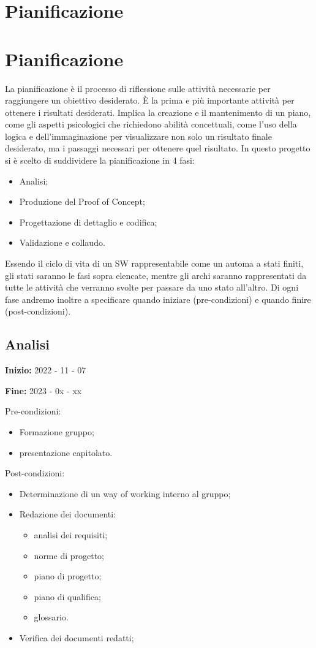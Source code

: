 \chapter{Pianificazione}
\chapter{Pianificazione}
La pianificazione è il processo di riflessione sulle attività necessarie per raggiungere un obiettivo desiderato. È la prima e più importante attività per ottenere i risultati desiderati. Implica la creazione e il mantenimento di un piano, come gli aspetti psicologici che richiedono abilità concettuali, come l'uso della logica e dell'immaginazione per visualizzare non solo un risultato finale desiderato, ma i passaggi necessari per ottenere quel risultato. In questo progetto si è scelto di suddividere la pianificazione in 4 fasi: 
\begin{itemize}
    \item Analisi;
    \item Produzione del Proof of Concept;
    \item Progettazione di dettaglio e codifica;
    \item Validazione e collaudo.
\end{itemize}
Essendo il ciclo di vita di un SW rappresentabile come un automa a stati finiti, gli stati saranno le fasi sopra elencate, mentre gli archi saranno rappresentati da tutte le attività che verranno svolte per passare da uno stato all'altro. Di ogni fase andremo inoltre a specificare quando iniziare (pre-condizioni) e quando finire (post-condizioni).

\section{Analisi}

\textbf{Inizio:} 2022 - 11 - 07 

\textbf{Fine:} 2023 - 0x - xx


Pre-condizioni:
\begin{itemize}
    \item Formazione gruppo;
    \item presentazione capitolato.
\end{itemize}

Post-condizioni:
    \begin{itemize}
        \item Determinazione di un way of working interno al gruppo;
        \item Redazione dei documenti:
        \begin{itemize}
            \item analisi dei requisiti;
            \item norme di progetto;
            \item piano di progetto;
            \item piano di qualifica;
            \item glossario.
        \end{itemize}
        \item Verifica dei documenti redatti;
    \end{itemize}

